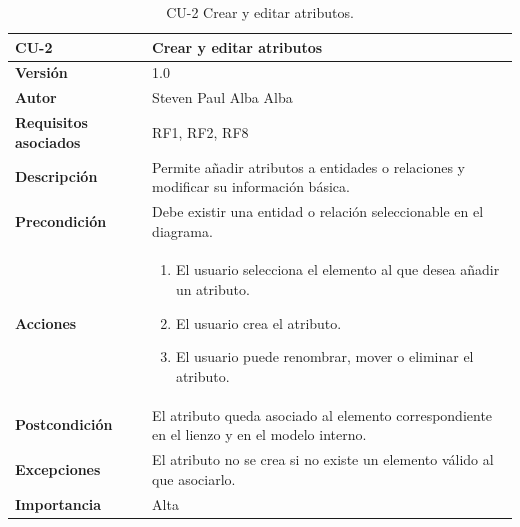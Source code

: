 \begin{table}[p]
\centering
\begin{tabularx}{\linewidth}{ p{} p{} }
\toprule
\textbf{CU-2} & \textbf{Crear y editar atributos}\\
\toprule
\textbf{Versión} & 1.0 \\
\textbf{Autor} & Steven Paul Alba Alba \\
\textbf{Requisitos asociados} & RF1, RF2, RF8 \\
\textbf{Descripción} & Permite añadir atributos a entidades o relaciones y modificar su información básica. \\
\textbf{Precondición} & Debe existir una entidad o relación seleccionable en el diagrama. \\
\textbf{Acciones} &
\begin{enumerate}
\def\labelenumi{\arabic{enumi}.}
\tightlist
\item El usuario selecciona el elemento al que desea añadir un atributo.
\item El usuario crea el atributo.
\item El usuario puede renombrar, mover o eliminar el atributo.
\end{enumerate}\\
\textbf{Postcondición} & El atributo queda asociado al elemento correspondiente en el lienzo y en el modelo interno. \\
\textbf{Excepciones} & El atributo no se crea si no existe un elemento válido al que asociarlo. \\
\textbf{Importancia} & Alta \\
\bottomrule
\end{tabularx}
\caption{CU-2 Crear y editar atributos.}
\end{table}

